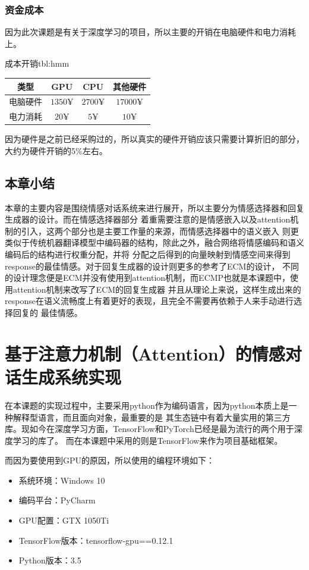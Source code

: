 \documentclass[supercite]{HustGraduPaper}
\theoremstyle{definition}
\begin{document}
\subsubsection{资金成本}
因为此次课题是有关于深度学习的项目，所以主要的开销在电脑硬件和电力消耗上。
\begin{generaltab}{成本开销}{tbl:hmm}
  \begin{tabular}{c|ccc}
    \toprule
    类型 & GPU & CPU & 其他硬件 \\
    \midrule
    电脑硬件 & $1350¥$ & $2700¥$ & $17000¥$ \\
    电力消耗 & $20¥$ & $5¥$ & $10¥$ \\
    \bottomrule
  \end{tabular}
\end{generaltab}
因为硬件是之前已经采购过的，所以真实的硬件开销应该只需要计算折旧的部分，大约为硬件开销的5\%左右。


\subsection{本章小结}
本章的主要内容是围绕情感对话系统来进行展开，所以主要分为情感选择器和回复生成器的设计。而在情感选择器部分
着重需要注意的是情感嵌入以及attention机制的引入，这两个部分也是主要工作量的来源，而情感选择器中的语义嵌入
则更类似于传统机器翻译模型中编码器的结构，除此之外，融合网络将情感编码和语义编码后的结构进行权重分配，并将
分配之后得到的向量映射到情感空间来得到response的最佳情感。对于回复生成器的设计则更多的参考了ECM的设计，
不同的设计理念便是ECM并没有使用到attention机制，而ECMP也就是本课题中，使用attention机制来改写了ECM的回复生成器
并且从理论上来说，这样生成出来的response在语义流畅度上有着更好的表现，且完全不需要再依赖于人来手动进行选择回复的
最佳情感。

\section{基于注意力机制（Attention）的情感对话生成系统实现}
在本课题的实现过程中，主要采用python作为编码语言，因为python本质上是一种解释型语言，而且面向对象，最重要的是
其生态链中有着大量实用的第三方库。现如今在深度学习方面，TensorFlow和PyTorch已经是最为流行的两个用于深度学习的库了。
而在本课题中采用的则是TensorFlow来作为项目基础框架。

而因为要使用到GPU的原因，所以使用的编程环境如下：
\begin{itemize}
  \item 系统环境：Windows 10
  \item 编码平台：PyCharm
  \item GPU配置：GTX 1050Ti
  \item TensorFlow版本：tensorflow-gpu==0.12.1
  \item Python版本：3.5
\end{itemize}
\end{document}
